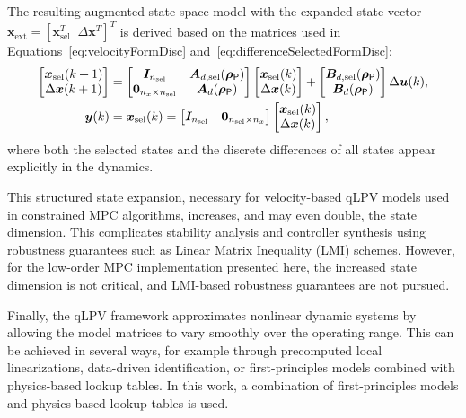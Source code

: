 The resulting augmented state-space model with the expanded state vector $\bm{x}_{\text{ext}} =[\bm{x}_{\text{sel}}^T \; \; \Delta\bm{x}^T ]^T$ is derived based on the matrices used in Equations~\eqref{eq:velocityFormDisc} and~\eqref{eq:differenceSelectedFormDisc}:
\begin{equation}\label{eq:discreteVelocityqLPV}
    \begin{aligned}
        \begin{bmatrix} \bm{x}_{\text{sel}}(k+1) \\ \Delta\bm{x}(k+1) \end{bmatrix} 
        &= \begin{bmatrix} \bm{I}_{n_{\text{sel}}} & \bm{A}_{d,\text{sel}}(\bm{\rho}_{\mathsf{P}}) \\ 
            \bm{0}_{n_x \times n_\text{sel}} & \bm{A}_d(\bm{\rho}_{\mathsf{P}}) 
        \end{bmatrix}
        \begin{bmatrix} \bm{x}_{\text{sel}}(k) \\ \Delta\bm{x}(k) \end{bmatrix}
        + \begin{bmatrix} \bm{B}_{d,\text{sel}}(\bm{\rho}_{\mathsf{P}}) \\ \bm{B}_d(\bm{\rho}_{\mathsf{P}}) \end{bmatrix} \Delta\bm{u}(k), \\
        \bm{y}(k) &= \bm{x}_{\text{sel}}(k) = \begin{bmatrix} \bm{I}_{n_{\text{sel}}} & \bm{0}_{n_\text{sel} \times n_x} \end{bmatrix} 
        \begin{bmatrix} \bm{x}_{\text{sel}}(k) \\ \Delta\bm{x}(k) \end{bmatrix},
    \end{aligned}
\end{equation}
where both the selected states and the discrete differences of all states appear explicitly in the dynamics. 

This structured state expansion, necessary for velocity-based qLPV models used in constrained MPC algorithms, increases, and may even double, the state dimension. This complicates stability analysis and controller synthesis using robustness guarantees such as Linear Matrix Inequality (LMI) schemes. However, for the low-order MPC implementation presented here, the increased state dimension is not critical, and LMI-based robustness guarantees are not pursued.

Finally, the qLPV framework approximates nonlinear dynamic systems by allowing the model matrices to vary smoothly over the operating range. This can be achieved in several ways, for example through precomputed local linearizations, data-driven identification, or first-principles models combined with physics-based lookup tables. In this work, a combination of first-principles models and physics-based lookup tables is used.


